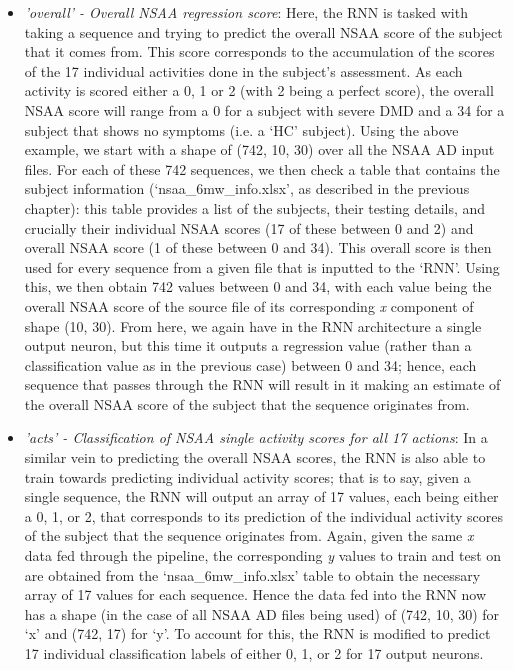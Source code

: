 \documentclass[12pt,twoside]{report}
\begin{document}
\begin{itemize}
	\item \textit{'overall' - Overall NSAA regression score}: Here, the RNN is tasked with taking a sequence and trying to predict the overall NSAA score of the subject that it comes from. This score corresponds to the accumulation of the scores of the 17 individual activities done in the subject’s assessment. As each activity is scored either a 0, 1 or 2 (with 2 being a perfect score), the overall NSAA score will range from a 0 for a subject with severe DMD and a 34 for a subject that shows no symptoms (i.e. a ‘HC’ subject). Using the above example, we start with a shape of (742, 10, 30) over all the NSAA AD input files. For each of these 742 sequences, we then check a table that contains the subject information (‘nsaa\_6mw\_info.xlsx’, as described in the previous chapter): this table provides a list of the subjects, their testing details, and crucially their individual NSAA scores (17 of these between 0 and 2) and overall NSAA score (1 of these between 0 and 34). This overall score is then used for every sequence from a given file that is inputted to the ‘RNN’. Using this, we then obtain 742 values between 0 and 34, with each value being the overall NSAA score of the source file of its corresponding \textit{x} component of shape (10, 30). From here, we again have in the RNN architecture a single output neuron, but this time it outputs a regression value (rather than a classification value as in the previous case) between 0 and 34; hence, each sequence that passes through the RNN will result in it making an estimate of the overall NSAA score of the subject that the sequence originates from.
	\item \textit{'acts' - Classification of NSAA single activity scores for all 17 actions}: In a similar vein to predicting the overall NSAA scores, the RNN is also able to train towards predicting individual activity scores; that is to say, given a single sequence, the RNN will output an array of 17 values, each being either a 0, 1, or 2, that corresponds to its prediction of the individual activity scores of the subject that the sequence originates from. Again, given the same \textit{x} data fed through the pipeline, the corresponding \textit{y} values to train and test on are obtained from the ‘nsaa\_6mw\_info.xlsx’ table to obtain the necessary array of 17 values for each sequence. Hence the data fed into the RNN now has a shape (in the case of all NSAA AD files being used) of (742, 10, 30) for ‘x’ and (742, 17) for ‘y’. To account for this, the RNN is modified to predict 17 individual classification labels of either 0, 1, or 2 for 17 output neurons.
\end{itemize}
\end{document}

